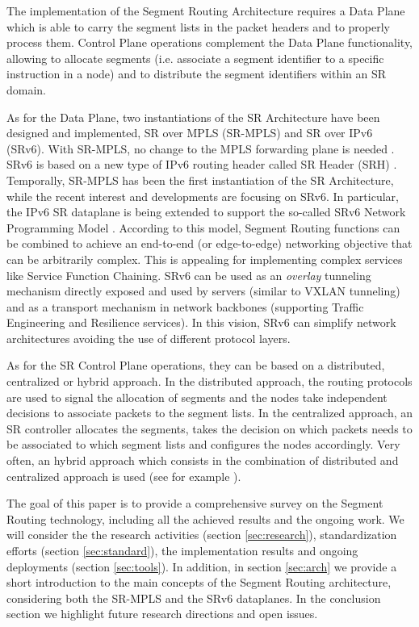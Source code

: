 The implementation of the Segment Routing Architecture requires a Data Plane which is able to carry the segment lists in the packet headers and to properly process them. Control Plane operations complement the Data Plane functionality, allowing to allocate segments (i.e. associate a segment identifier to a specific instruction in a node) and to distribute the segment identifiers within an SR domain.

As for the Data Plane, two instantiations of the SR Architecture have been designed and implemented, SR over MPLS (SR-MPLS) and SR over IPv6 (SRv6). With SR-MPLS, no change to the MPLS forwarding plane is needed \cite{id-segment-routing-mpls}. SRv6 is based on a new type of IPv6 routing header called SR Header (SRH) \cite{ietf-6man-segment-routing-header}. Temporally, SR-MPLS has been the first instantiation of the SR Architecture, while the recent interest and developments are focusing on SRv6. In particular, the IPv6 SR dataplane is being extended to support the so-called SRv6 Network Programming Model \cite{id-srv6-network-prog}. According to this model, Segment Routing functions can be combined to achieve an end-to-end (or edge-to-edge) networking objective that can be arbitrarily complex. This is appealing for implementing complex services like Service Function Chaining. SRv6 can be used as an \textit{overlay} tunneling mechanism directly exposed and used by servers (similar to VXLAN tunneling) and as a transport mechanism in network backbones (supporting Traffic Engineering and Resilience services). In this vision, SRv6 can simplify network architectures avoiding the use of different protocol layers. 

As for the SR Control Plane operations, they can be based on a distributed, centralized or hybrid approach. In the distributed approach, the routing protocols are used to signal the allocation of segments and the nodes take independent decisions to associate packets to the segment lists. In the centralized approach, an SR controller allocates the segments, takes the decision on which packets needs to be associated to which segment lists and configures the nodes accordingly. Very often, an hybrid approach which consists in the combination of distributed and centralized approach is used (see for example \cite{ventre2018sdn}). 

The goal of this paper is to provide a comprehensive survey on the Segment Routing technology, including all the achieved results and the ongoing work. We will consider the the research activities (section \ref{sec:research}), standardization efforts (section \ref{sec:standard}), the implementation results and ongoing deployments (section \ref{sec:tools}). In addition, in section \ref{sec:arch} we provide a short introduction to the main concepts of the Segment Routing architecture, considering both the SR-MPLS and the SRv6 dataplanes. In the conclusion section we highlight future research directions and open issues.  

